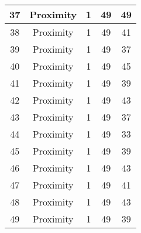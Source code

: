 \documentclass[results.tex]{subfiles}
\begin{document}
\begin{center}
\begin{tabular}{| c || c | c | c | c |}
            \hline
            37                      & Proximity                    & 1                      & 49                      & 49                   \\
            \hline
            38                      & Proximity                    & 1                      & 49                      & 41                   \\
            \hline
            39                      & Proximity                    & 1                      & 49                      & 37                   \\
            \hline
            40                      & Proximity                    & 1                      & 49                      & 45                   \\
            \hline
            41                      & Proximity                    & 1                      & 49                      & 39                   \\
            \hline
            42                      & Proximity                    & 1                      & 49                      & 43                   \\
            \hline
            43                      & Proximity                    & 1                      & 49                      & 37                   \\
            \hline
            44                      & Proximity                    & 1                      & 49                      & 33                   \\
            \hline
            45                      & Proximity                    & 1                      & 49                      & 39                   \\
            \hline
            46                      & Proximity                    & 1                      & 49                      & 43                   \\
            \hline
            47                      & Proximity                    & 1                      & 49                      & 41                   \\
            \hline
            48                      & Proximity                    & 1                      & 49                      & 43                   \\
            \hline
            49                      & Proximity                    & 1                      & 49                      & 39                   \\
            \hline
        \end{tabular}
    \end{center}
\end{document}
